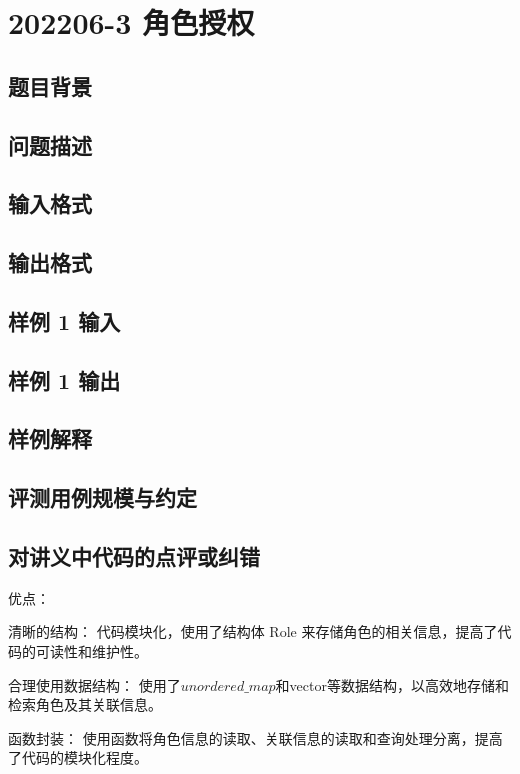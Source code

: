 \section{202206-3 角色授权}

\subsection{题目背景}

\subsection{问题描述}

\subsection{输入格式}

\subsection{输出格式}

\subsection{样例 1 输入}

\subsection{样例 1 输出}

\subsection{样例解释}

\subsection{评测用例规模与约定}

\subsection{对讲义中代码的点评或纠错}
 
优点：

清晰的结构： 代码模块化，使用了结构体 Role 来存储角色的相关信息，提高了代码的可读性和维护性。

合理使用数据结构： 使用了$unordered\_map$和vector等数据结构，以高效地存储和检索角色及其关联信息。

函数封装： 使用函数将角色信息的读取、关联信息的读取和查询处理分离，提高了代码的模块化程度。


